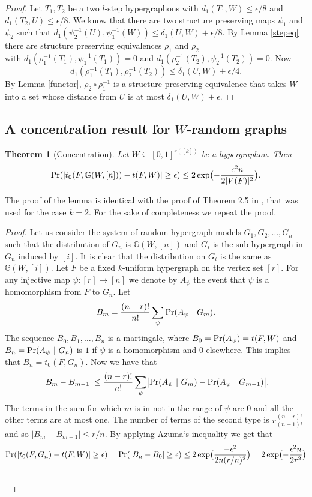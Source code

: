 \documentclass [11pt] {article}
\newcommand{\qed} {\hspace {0.1in} \rule {1.5mm} {3.5mm}}
\newtheorem{theorem}{Theorem}
\begin{document}
\begin{proof} Let $T_1,T_2$ be a two $l$-step hypergraphons 
with $d_1(T_1,W)\leq\epsilon/8$ and $d_1(T_2,U)\leq\epsilon/8$. We know that
there are two structure preserving maps $\psi_1$ and $\psi_2$ 
such that $d_1(\psi_2^{-1}(U),\psi_1^{-1}(W))\leq\delta_1(U,W)+\epsilon/8$. By
Lemma \ref{stepeq} there are structure preserving equivalences 
$\rho_1$ and $\rho_2$ \\ with $d_1(\rho_1^{-1}(T_1),\psi_1^{-1}(T_1))=0$ 
and $d_1(\rho_2^{-1}(T_2),\psi_2^{-1}(T_2))=0$.
Now $$d_1(\rho_1^{-1}(T_1),\rho_2^{-1}(T_2))\leq\delta_1(U,W)+\epsilon/4.$$
By Lemma \ref{functor},
 $\rho_2\circ\rho_1^{-1}$ is a structure preserving equivalence 
that takes $W$ into a set whose distance from $U$ is at most 
$\delta_1(U,W)+\epsilon$.
\end{proof}
\subsection{A concentration result for $W$-random graphs}


\begin{theorem}[Concentration]\label{conc} Let 
$W\subseteq[0,1]^{r([k])}$ be a hypergraphon. 
Then
$${\rm Pr}(|t_0(F,\mathbb{G}(W,[n]))-t(F,W)|\geq\epsilon)\leq 
2\exp\bigl(-\frac{\epsilon^2n}{2|V(F)|^2}\bigr).$$
\end{theorem}

The proof of the lemma is identical with the proof of Theorem 2.5
in \cite{LSZ},
that was used for the case $k=2$.
For the sake of completeness we repeat the proof.

\begin{proof}
Let us consider the system of random hypergraph models 
$G_1,G_2,\dots,G_n$ such that the distribution of $G_n$ is 
$\mathbb{G}(W,[n])$ and $G_i$ is the sub hypergraph in $G_n$ 
induced by $[i]$. It is clear that the distribution on $G_i$ is
 the same as $\mathbb{G}(W,[i])$.
Let $F$ be a fixed $k$-uniform hypergraph on the vertex set $[r]$.
For any injective map $\psi:[r]\mapsto[n]$ we denote by $A_\psi$ the 
event that $\psi$ is a homomorphism from $F$ to $G_n$. Let
$$B_m=\frac{(n-r)!}{n!}\sum_\psi{\rm Pr}(A_\psi~|~G_m).$$
The sequence $B_0,B_1,\dots,B_n$ is a martingale,
where $B_0={\rm Pr}(A_\psi)=t(F,W)$ and \\ $B_n=
{\rm Pr}(A_\psi~|~G_n)$ is $1$ if $\psi$ is a homomorphism and $0$
elsewhere. 
This implies that $B_n=t_0(F,G_n)$. Now we have that
$$|B_m-B_{m-1}|\leq\frac{(n-r)!}{n!}\sum_{\psi}\bigl|{\rm Pr}
(A_\psi~|~G_m)-{\rm Pr}(A_\psi~|~G_{m-1})\bigr|.$$
The terms in the sum for which $m$ is in not in the range of 
$\psi$ are $0$ and all the other terms are at most one. The 
number of terms of the second type is $r\frac{(n-r)!}{(n-1)!}$ and so 
$|B_m-B_{m-1}|\leq r/n$. By applying Azuma`s inequality we get that
$${\rm Pr}(|t_0(F,G_n)-t(F,W)|\geq\epsilon)={\rm
  Pr}(|B_n-B_0|\geq\epsilon)\leq
2\exp\bigl(\frac{-\epsilon^2}{2n(r/n)^2}\bigr)=
2\exp\bigl(-\frac{\epsilon^2n}{2r^2}\bigr)$$
\qed
\end{proof}
\end{document}
